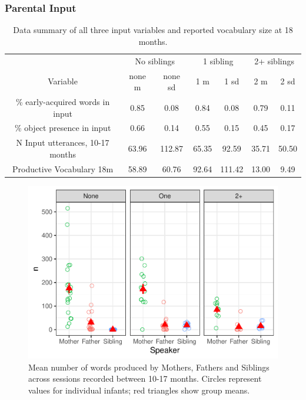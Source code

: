 \documentclass[
  english,
  man,floatsintext]{apa6}
\begin{document}
\hypertarget{parental-input}{%
\subsubsection{Parental Input}\label{parental-input}}

\begin{table}

\caption{\label{tab:table-data-summary}Data summary of all three input variables and reported vocabulary size at 18 months.}
\centering
\begin{tabular}[t]{ccccccc}
\toprule
\multicolumn{1}{c}{ } & \multicolumn{2}{c}{No siblings} & \multicolumn{2}{c}{1 sibling} & \multicolumn{2}{c}{2+ siblings} \\
\cmidrule(l{3pt}r{3pt}){2-3} \cmidrule(l{3pt}r{3pt}){4-5} \cmidrule(l{3pt}r{3pt}){6-7}
Variable & none m & none sd & 1 m & 1 sd & 2 m & 2 sd\\
\midrule
\% early-acquired words in input & 0.85 & 0.08 & 0.84 & 0.08 & 0.79 & 0.11\\
\% object presence in input & 0.66 & 0.14 & 0.55 & 0.15 & 0.45 & 0.17\\
N Input utterances, 10-17 months & 63.96 & 112.87 & 65.35 & 92.59 & 35.71 & 50.50\\
Productive Vocabulary 18m & 58.89 & 60.76 & 92.64 & 111.42 & 13.00 & 9.49\\
\bottomrule
\end{tabular}
\end{table}

\begin{figure}
\centering
\includegraphics{SiblingsStudyText_files/figure-latex/Figure-Speaker-count-1.pdf}
\caption{\label{fig:Figure-Speaker-count}Mean number of words produced by Mothers, Fathers and Siblings across sessions recorded between 10-17 months. Circles represent values for individual infants; red triangles show group means.}
\end{figure}
\end{document}
